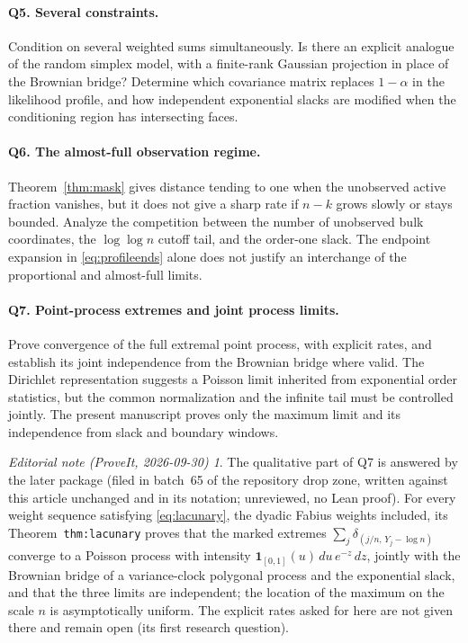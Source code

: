 \documentclass[11pt,letterpaper]{article}
\numberwithin{equation}{section}
\theoremstyle{definition}
\theoremstyle{remark}
\newtheorem*{ednote}{Editorial note (ProveIt, 2026-09-30)}
\begin{document}
\paragraph{Q5. Several constraints.}
Condition on several weighted sums simultaneously. Is there an explicit
analogue of the random simplex model, with a finite-rank Gaussian projection
in place of the Brownian bridge? Determine which covariance matrix replaces
$1-\alpha$ in the likelihood profile, and how independent exponential slacks
are modified when the conditioning region has intersecting faces.

\paragraph{Q6. The almost-full observation regime.}
Theorem~\ref{thm:mask} gives distance tending to one when the unobserved active
fraction vanishes, but it does not give a sharp rate if $n-k$ grows slowly
or stays bounded. Analyze the competition between the number of unobserved
bulk coordinates, the $\log\log n$ cutoff tail, and the order-one slack.
The endpoint expansion in \eqref{eq:profileends} alone does not justify an
interchange of the proportional and almost-full limits.

\paragraph{Q7. Point-process extremes and joint process limits.}
Prove convergence of the full extremal point process, with explicit rates,
and establish its joint independence from the Brownian bridge where valid.
The Dirichlet representation suggests a Poisson limit inherited from
exponential order statistics, but the common normalization and the infinite
tail must be controlled jointly. The present manuscript proves only the
maximum limit and its independence from slack and boundary windows.
\begin{ednote}
The qualitative part of Q7 is answered by the later package
(filed in batch~65 of the repository drop zone, written against this
article unchanged and in its notation; unreviewed, no Lean proof). For
every weight sequence satisfying \eqref{eq:lacunary}, the dyadic Fabius
weights included, its Theorem~\texttt{thm:lacunary} proves that the marked
extremes $\sum_j\delta_{(j/n,\,Y_j-\log n)}$ converge to a Poisson process
with intensity $\mathbf 1_{[0,1]}(u)\,du\,e^{-z}\,dz$, jointly with the
Brownian bridge of a variance-clock polygonal process and the exponential
slack, and that the three limits are independent; the location of the
maximum on the scale $n$ is asymptotically uniform. The explicit rates
asked for here are not given there and remain open (its first research
question).
\end{ednote}
\end{document}
